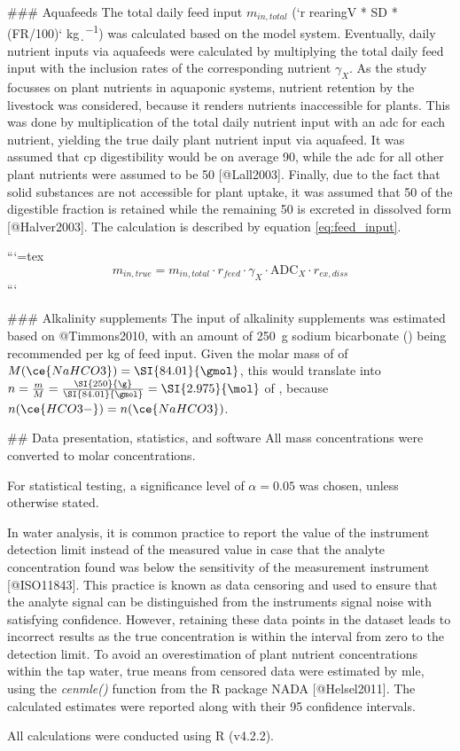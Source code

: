 ### Aquafeeds
The total daily feed input $m_{in,total}$ (`r rearingV * SD * (FR/100)` \si{\kg\per\d}) was calculated based on the model system. Eventually, daily nutrient inputs via aquafeeds were calculated by multiplying the total daily feed input with the inclusion rates of the corresponding nutrient $\gamma_{X}$. As the study focusses on plant nutrients in aquaponic systems, nutrient retention by the livestock was considered, because it renders nutrients inaccessible for plants. This was done by multiplication of the total daily nutrient input with an \gls{adc} for each nutrient, yielding the true daily plant nutrient input via aquafeed. It was assumed that \gls{cp} digestibility would be on average \SI{90}{\p}, while the \gls{adc} for all other plant nutrients were assumed to be \SI{50}{\p} [@Lall2003]. Finally, due to the fact that solid substances are not accessible for plant uptake, it was assumed that \SI{50}{\p} of the digestible fraction is retained while the remaining \SI{50}{\p} is excreted in dissolved form [@Halver2003]. The calculation is described by equation \ref{eq:feed_input}.

```{=tex}
\begin{equation}
  m_{in,true} = m_{in,total} \cdot r_{feed} \cdot \gamma_{X} \cdot \text{ADC}_{X} \cdot r_{ex,diss}
  \label{eq:feed_input}
\end{equation}
```



### Alkalinity supplements
The input of alkalinity supplements was estimated based on @Timmons2010, with an amount of \SI{250}{\g} sodium bicarbonate () being recommended per \si{\kg} of feed input. Given the molar mass of  of $M(\ce{NaHCO3}) = \SI{84.01}{\gmol}$, this would translate into $n = \frac{m}{M} = \frac{\SI{250}{\g}}{\SI{84.01}{\gmol}} = \SI{2.975}{\mol}$ of , because $n(\ce{HCO3-}) = n(\ce{NaHCO3})$.  




## Data presentation, statistics, and software
All mass concentrations were converted to molar concentrations.

For statistical testing, a significance level of $\alpha = 0.05$ was chosen, unless otherwise stated.

In water analysis, it is common practice to report the value of the instrument detection limit instead of the measured value in case that the analyte concentration found was below the sensitivity of the measurement instrument [@ISO11843]. This practice is known as data censoring and used to ensure that the analyte signal can be distinguished from the instruments signal noise with satisfying confidence. However, retaining these data points in the dataset leads to incorrect results as the true concentration is within the interval from zero to the detection limit. To avoid an overestimation of plant nutrient concentrations within the tap water, true means from censored data were estimated by \gls{mle}, using the \emph{cenmle()} function from the R package NADA [@Helsel2011]. The calculated estimates were reported along with their \SI{95}{\p} confidence intervals.

All calculations were conducted using R (v4.2.2).
